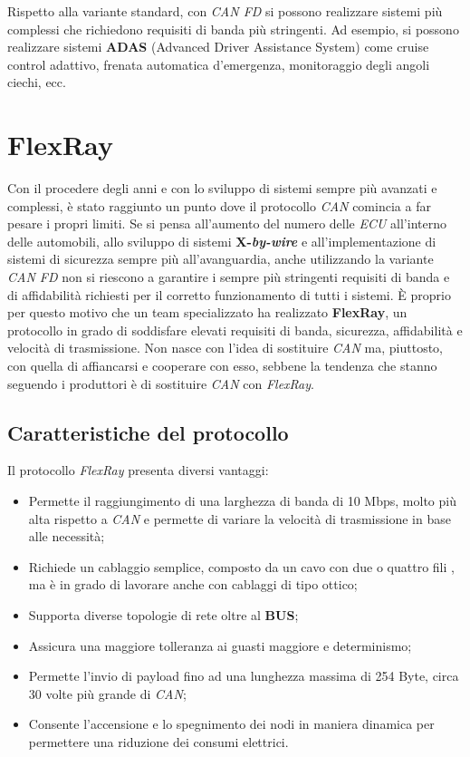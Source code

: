 Rispetto alla variante standard, con \emph{CAN FD} si possono realizzare sistemi più complessi che richiedono requisiti di banda più stringenti. Ad esempio, si possono realizzare sistemi \textbf{ADAS} (Advanced Driver Assistance System) come cruise control adattivo, frenata automatica d'emergenza, monitoraggio degli angoli ciechi, ecc. \cite{css_electronics_canfd}

\section{FlexRay}
Con il procedere degli anni e con lo sviluppo di sistemi sempre più avanzati e complessi, è stato raggiunto un punto dove il protocollo \emph{CAN} comincia a far pesare i propri limiti. Se si pensa all'aumento del numero delle \emph{ECU} all'interno delle automobili, allo sviluppo di sistemi \textbf{X-\emph{by-wire}} e all'implementazione di sistemi di sicurezza sempre più all'avanguardia, anche utilizzando la variante \emph{CAN FD} non si riescono a garantire i sempre più stringenti requisiti di banda e di affidabilità richiesti per il corretto funzionamento di tutti i sistemi. È proprio per questo motivo che un team specializzato ha realizzato \textbf{FlexRay}, un protocollo in grado di soddisfare elevati requisiti di banda, sicurezza, affidabilità e velocità di trasmissione. Non nasce con l'idea di sostituire \emph{CAN} ma, piuttosto, con quella di affiancarsi e cooperare con esso, sebbene la tendenza che stanno seguendo i produttori è di sostituire \emph{CAN} con \emph{FlexRay}.

\subsection{Caratteristiche del protocollo}
Il protocollo \emph{FlexRay} presenta diversi vantaggi:
\begin{itemize}
    \item Permette il raggiungimento di una larghezza di banda di 10 Mbps, molto più alta rispetto a \emph{CAN} e permette di variare la velocità di trasmissione in base alle necessità;
    \item Richiede un cablaggio semplice, composto da un cavo con due o quattro fili \cite{ni_flexray}, ma è in grado di lavorare anche con cablaggi di tipo ottico;
    \item Supporta diverse topologie di rete oltre al \textbf{BUS};
    \item Assicura una maggiore tolleranza ai guasti maggiore e determinismo;
    \item Permette l'invio di payload fino ad una lunghezza massima di 254 Byte, circa 30 volte più grande di \emph{CAN};
    \item Consente l'accensione e lo spegnimento dei nodi in maniera dinamica per permettere una riduzione dei consumi elettrici.
\end{itemize}

